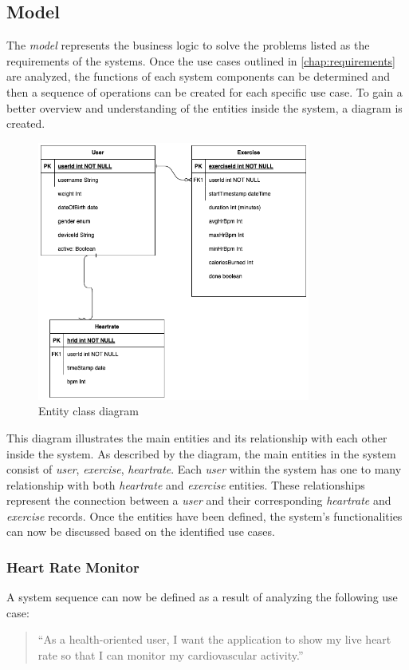 \subsection{Model}
The \emph{model} represents the business logic to solve the problems listed as the requirements of the systems. Once the use cases outlined in \autoref{chap:requirements} are analyzed, the functions of each system components can be determined and then a sequence of operations can be created for each specific use case.
To gain a better overview and understanding of the entities inside the system, a diagram is created.
\begin{figure}[H]
    \centering
    \includegraphics[width=0.8\textwidth]{diagrams/ham-entity.drawio.png}
    \caption{Entity class diagram}
    \label{fig:entity_diagram}
\end{figure}
This diagram illustrates the main entities and its relationship with each other inside the system. As described by the diagram, the main entities in the system consist of \emph{user}, \emph{exercise}, \emph{heartrate}. 
Each \emph{user} within the system has one to many relationship with both \emph{heartrate} and \emph{exercise} entities. These relationships represent the connection between a \emph{user} and their corresponding \emph{heartrate} and \emph{exercise} records. 
Once the entities have been defined, the system's functionalities can now be discussed based on the identified use cases.

\subsubsection{Heart Rate Monitor}
A system sequence can now be defined as a result of analyzing the following use case:
\begin{quotation}
    \enquote{As a health-oriented user, I want the application to show my live heart rate so that I can monitor my cardiovascular activity.} 
\end{quotation}

